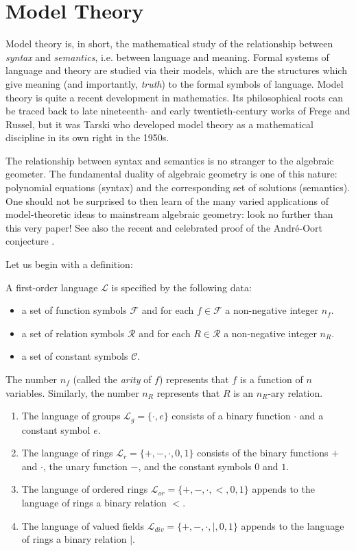 \section{Model Theory}
Model theory is, in short, the mathematical study of the relationship between \emph{syntax} and \emph{semantics}, i.e. between language and meaning. Formal systems of language and theory are studied via their models, which are the structures which give meaning (and importantly, \emph{truth}) to the formal symbols of language. Model theory is quite a recent development in mathematics. Its philosophical roots can be traced back to late nineteenth- and early twentieth-century works of Frege and Russel, but it was Tarski who developed model theory as a mathematical discipline in its own right in the 1950s.

The relationship between syntax and semantics is no stranger to the algebraic geometer. The fundamental duality of algebraic geometry is one of this nature: polynomial equations (syntax) and the corresponding set of solutions (semantics). One should not be surprised to then learn of the many varied applications of model-theoretic ideas to mainstream algebraic geometry: look no further than this very paper! See also the recent and celebrated proof of the Andr\'e-Oort conjecture \cite{pila2022canonical}.

Let us begin with a definition:

\begin{definition}
A first-order language $\mathcal{L}$ is specified by the following data:
\begin{itemize}
	\item a set of function symbols $\mathcal{F}$ and for each $f\in \mathcal{F}$ a non-negative integer $n_f$.
	\item a set of relation symbols $\mathcal{R}$ and for each $R\in \mathcal{R}$ a non-negative integer $n_R$.
	\item a set of constant symbols $\mathcal{C}$.
\end{itemize}
The number $n_f$ (called the \emph{arity} of $f$) represents that $f$ is a function of $n$ variables. Similarly, the number $n_R$ represents that $R$ is an $n_R$-ary relation.
\end{definition}

\begin{example}
	\begin{enumerate}
		\item The language of groups $\mathcal{L}_g=\{\cdot, e\}$ consists of a binary function $\cdot$ and a constant symbol $e$.
		\item The language of rings $\mathcal{L}_r=\{+,-,\cdot, 0,1\}$ consists of the binary functions $+$ and $\cdot$, the unary function $-$, and the constant symbols $0$ and $1$. 
		\item The language of ordered rings $\mathcal{L}_{or} = \{+,-,\cdot,<,0,1\}$ appends to the language of rings a binary relation $<$.
		\item The language of valued fields $\mathcal{L}_{div}=\{+,-,\cdot,\mid, 0,1\}$ appends to the language of rings a binary relation $\mid$.
	\end{enumerate}
\end{example}

